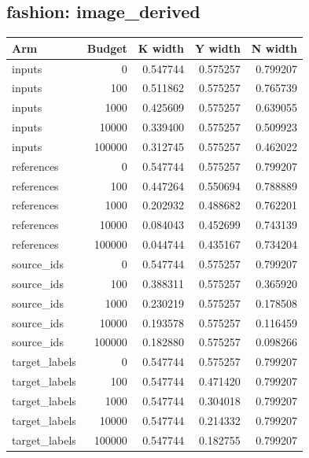\reservetable
\subsection{fashion: image\_derived}

\begingroup\small
\setlength{\tabcolsep}{4pt}
\begin{longtable}{lrrrr}
\toprule

Arm & Budget & K width & Y width & N width\\\midrule\endhead

inputs & 0 & 0.547744 & 0.575257 & 0.799207\\

inputs & 100 & 0.511862 & 0.575257 & 0.765739\\

inputs & 1000 & 0.425609 & 0.575257 & 0.639055\\

inputs & 10000 & 0.339400 & 0.575257 & 0.509923\\

inputs & 100000 & 0.312745 & 0.575257 & 0.462022\\

references & 0 & 0.547744 & 0.575257 & 0.799207\\

references & 100 & 0.447264 & 0.550694 & 0.788889\\

references & 1000 & 0.202932 & 0.488682 & 0.762201\\

references & 10000 & 0.084043 & 0.452699 & 0.743139\\

references & 100000 & 0.044744 & 0.435167 & 0.734204\\

source\_ids & 0 & 0.547744 & 0.575257 & 0.799207\\

source\_ids & 100 & 0.388311 & 0.575257 & 0.365920\\

source\_ids & 1000 & 0.230219 & 0.575257 & 0.178508\\

source\_ids & 10000 & 0.193578 & 0.575257 & 0.116459\\

source\_ids & 100000 & 0.182880 & 0.575257 & 0.098266\\

target\_labels & 0 & 0.547744 & 0.575257 & 0.799207\\

target\_labels & 100 & 0.547744 & 0.471420 & 0.799207\\

target\_labels & 1000 & 0.547744 & 0.304018 & 0.799207\\

target\_labels & 10000 & 0.547744 & 0.214332 & 0.799207\\

target\_labels & 100000 & 0.547744 & 0.182755 & 0.799207\\

\bottomrule
\end{longtable}
\endgroup

